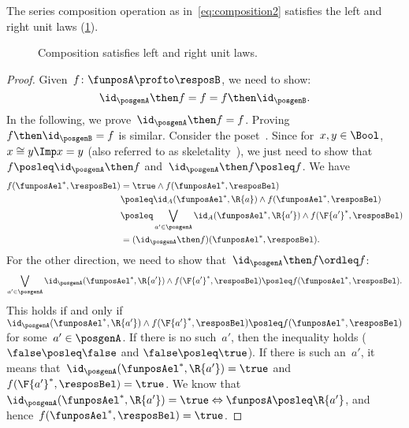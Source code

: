 \begin{lemma}\label{lem:compositionunital}
  The series composition operation as in~\cref{eq:composition2} satisfies the left and right unit laws (\cref{fig:compositionunital}).
\end{lemma}
  \begin{figure}[h!]
    \begin{center}
    \end{center}
    \caption{Composition satisfies left and right unit laws. \label{fig:compositionunital}}
  \end{figure}
\begin{proof}
  Given~$f\colon \funposA\profto \resposB$, we need to show:
  \begin{equation*}
    \id_\posgenA \then f= f = f\then \id_\posgenB.
  \end{equation*}
  In the following, we prove~$\id_\posgenA \then f = f$. Proving~$f\then \id_\posgenB=f$ is similar.
  Consider the poset~\Bool. Since for~$x,y\in \Bool$,~$x\cong y \Imp x=y$ (also referred to as skeletality~\cite{fong2019}), we just need to show that~$f\posleq \id_\posgenA\then f$ and~$\id_\posgenA\then f\posleq f$.
  We have
  \begin{equation*}
    \label{eq:dp_unit_1}
    \begin{aligned}
      f(\funposAel^*,\resposBel)&=\true \wedge f(\funposAel^*,\resposBel)\\
      &\posleq \id_A(\funposAel^*,\R{a}) \wedge f(\funposAel^*,\resposBel)\\
      &\posleq \bigvee_{a'\in \posgenA}\id_A(\funposAel^*,\R{a'})\wedge f(\F{a'}^*,\resposBel)\\
      &=(\id_\posgenA\then f)(\funposAel^*,\resposBel).
    \end{aligned}
  \end{equation*}
  For the other direction, we need to show that~$\id_\posgenA\then f\ordleq f$:
  \begin{equation*}
    \label{eq:dp_unit_2}
    \bigvee_{a'\in \posgenA}\id_\posgenA(\funposAel^*,\R{a'})\wedge f(\F{a'}^*,\resposBel) \posleq f(\funposAel^*,\resposBel).
  \end{equation*}
  This holds if and only if~$\id_\posgenA(\funposAel^*,\R{a'})\wedge f(\F{a'}^*,\resposBel) \posleq f(\funposAel^*,\resposBel)$ for some~$a'\in \posgenA$.
  If there is no such~$a'$, then the inequality holds ($\false \posleq \false$ and $\false \posleq \true$).
  If there is such an~$a'$, it means that~$\id_\posgenA(\funposAel^*,\R{a'})=\true$ and~$f(\F{a'}^*,\resposBel)=\true$.
  We know that~$\id_\posgenA(\funposAel^*,\R{a'})=\true \Leftrightarrow \funposA\posleq \R{a'}$, and hence~$f(\funposAel^*,\resposBel)=\true$.
\end{proof}
